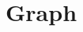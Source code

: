\documentclass[10pt,landscape,a4paper,twocolumn]{article}
\begin{document}
\begin{comment}
\subsection{Knuth Optimization}

$O(n^{3}) \to O(n^{2})$

ì¡°ê±Ž 1) DP ì íì êŒŽ

$D[i][j] = \min_{i<k<j}( D[i][k] + D[k][j] ) + C[i][j]$

ì¡°ê±Ž 2) ì¬ê° ë¶ë±ì

$C[a][c] + C[b][d] \leq C[a][d] + C[b][c] \phantom{1} (a \leq b \leq c \leq d)$

ì¡°ê±Ž 3) ëšì¡°ì±

$C[b][c] \leq C[a][d] \phantom{1} (a \leq b \leq c \leq d)$

ê²°ë¡ ) ì¡°ê±Ž 2, 3ì ë§ì¡±íë€ë©Ž  $A[i][j]$ë¥Œ $D[i][j]$ì ëµìŽ ëë ìµìì $k$ëŒ í  ë, ìëì ë¶ë±ìì ë§ì¡±íê² ëš

$A[i][j-1] \leq A[i][j] \leq A[i+1][j]$

3ì€ ë£šíë¥Œ ëëŠŽ ë ì ì¡°ê±Žì ìŽì©íë©Ž ìµì¢ì ìŒë¡ ìê°ë³µì¡ëê° $O(n^{2})$ ìŽ ëš
\end{comment}
\section{Graph}

%
\end{document}
